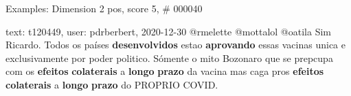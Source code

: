 \begin{frame}{Examples: Dimension 2 pos, score 5, \# 000040}
\footnotesize
\begin{exampleblock}{text: t120449, user: pdrberbert, 2020-12-30}
@rmelette @mottalol @oatila Sim Ricardo. Todos os países \textbf{desenvolvidos} 
estao \textbf{aprovando} essas vacinas unica e exclusivamente por poder 
politico. Sómente o mito Bozonaro que se prepcupa com os \textbf{efeitos} 
\textbf{colaterais} a \textbf{longo} \textbf{prazo} da vacina mas caga pros 
\textbf{efeitos} \textbf{colaterais} a \textbf{longo} \textbf{prazo} do PROPRIO 
COVID. 
\end{exampleblock}
\end{frame}
